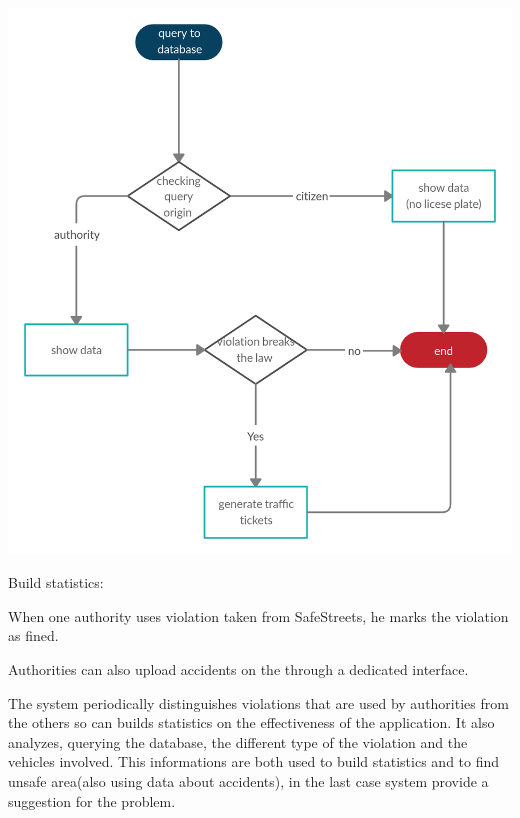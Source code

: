 \documentclass[a4paper, hidelinks, 12pt]{report}
\begin{document}
    \begin{center}
        \includegraphics[scale = 0.35]{assets/queryDb.jpg}\\[1.6 cm]
    \end{center}

	    Build statistics:

	    When one authority uses violation taken from SafeStreets, he marks the violation as fined.

	    Authorities can also upload accidents on the through a dedicated interface.

	    The system periodically distinguishes violations that are used by authorities from the others so can builds statistics on the effectiveness of the application. It also analyzes, querying the database, the different type of the violation and the vehicles involved. This informations are both used to build statistics and to find unsafe area(also using data about accidents), in the last case system provide a suggestion for the problem.
\end{document}
